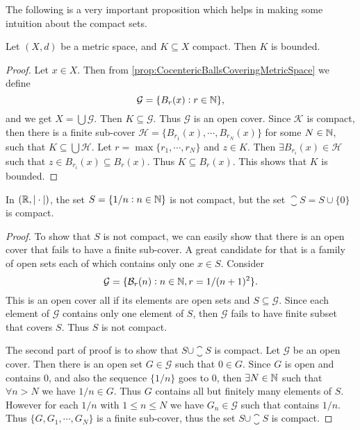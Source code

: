 The following is a very important proposition which helps in making some intuition about the compact sets.

\begin{proposition}
	Let $(X,d)$ be a metric space, and $K \subseteq X$ compact. Then $K$ is bounded.
\end{proposition}

\begin{proof}
	Let $x \in X$. Then from \autoref{prop:CocentericBallsCoveringMetricSpace} we define
	\[ \mathcal{G} =  \{ B_r(x): r \in \mathbb{N} \}, \]
	and we get $X = \bigcup \mathcal{G}$. Then $K \subseteq \mathcal{G}$. Thus $\mathcal{G}$ is an open cover. Since $\mathcal{K}$ is compact, then there is a finite sub-cover $ \mathcal{H} = \{ B_{r_1}(x), \cdots, B_{r_N}(x) \}$ for some $N \in \mathbb{N}$, such that $K \subseteq \bigcup \mathcal{H}$. Let $r = \max \{r_1, \cdots, r_N\}$ and $z \in K$. Then $\exists B_{r_i}(x) \in \mathcal{H}$ such that $z \in B_{r_i}(x) \subseteq B_r(x)$. Thus $K \subseteq B_r(x)$. This shows that $K$ is bounded. 
\end{proof}




\begin{lemma}
	In $(\mathbb{R},|\cdot|)$, the set $S = \{1/n: n \in \mathbb{N} \}$ is not compact, but the set $\closure{S} = S \cup \{0\}$ is compact. 
\end{lemma}

\begin{proof}
	To show that $S$ is not compact, we can easily show that there is an open cover that fails to have a finite sub-cover. A great candidate for that is a family of open sets each of which contains only one $x \in S$. Consider 
	\[ \mathcal{G} = \{ \mathcal{B}_{r}(n): n \in \mathbb{N}, r = 1/(n+1)^2 \}. \]
	This is an open cover all if its elements are open sets and $S \subseteq \mathcal{G}$. Since each element of $\mathcal{G}$ contains only one element of $S$, then $\mathcal{G}$ fails to have finite subset that covers $S$. Thus $S$ is not compact.
	
	The second part of proof is to show that $S \cup \closure{S}$ is compact. Let $\mathcal{G}$ be an open cover. Then there is an open set $G \in \mathcal{G}$ such that $0 \in G$. Since $G$ is open and contains 0, and also the sequence $\{1/n\}$ goes to 0, then $\exists N \in \mathbb{N}$ such that $\forall n > N$ we have $1/n \in G$. Thus $G$ contains all but finitely many elements of $S$. However for each $1/n$ with $1 \leq n \leq N$ we have $G_n \in \mathcal{G}$ such that contains $1/n$. Thus $\{ G, G_1, \cdots, G_N \}$ is a finite sub-cover, thus the set $S\cup \closure{S}$ is compact.
\end{proof}


